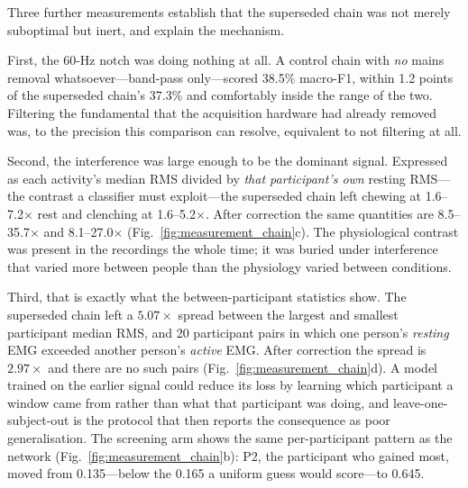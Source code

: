 \documentclass[pdflatex,sn-nature,iicol]{sn-jnl}
\begin{document}
Three further measurements establish that the superseded chain was not merely suboptimal but inert, and explain the mechanism.

First, the 60-Hz notch was doing nothing at all. A control chain with \emph{no} mains removal whatsoever---band-pass only---scored 38.5\% macro-F1, within 1.2 points of the superseded chain's 37.3\% and comfortably inside the range of the two. Filtering the fundamental that the acquisition hardware had already removed was, to the precision this comparison can resolve, equivalent to not filtering at all.

Second, the interference was large enough to be the dominant signal. Expressed as each activity's median RMS divided by \emph{that participant's own} resting RMS---the contrast a classifier must exploit---the superseded chain left chewing at 1.6--7.2$\times$ rest and clenching at 1.6--5.2$\times$. After correction the same quantities are 8.5--35.7$\times$ and 8.1--27.0$\times$ (Fig.~\ref{fig:measurement_chain}c). The physiological contrast was present in the recordings the whole time; it was buried under interference that varied more between people than the physiology varied between conditions.

Third, that is exactly what the between-participant statistics show. The superseded chain left a $5.07\times$ spread between the largest and smallest participant median RMS, and 20 participant pairs in which one person's \emph{resting} EMG exceeded another person's \emph{active} EMG. After correction the spread is $2.97\times$ and there are no such pairs (Fig.~\ref{fig:measurement_chain}d). A model trained on the earlier signal could reduce its loss by learning which participant a window came from rather than what that participant was doing, and leave-one-subject-out is the protocol that then reports the consequence as poor generalisation. The screening arm shows the same per-participant pattern as the network (Fig.~\ref{fig:measurement_chain}b): P2, the participant who gained most, moved from 0.135---below the 0.165 a uniform guess would score---to 0.645.
\end{document}
